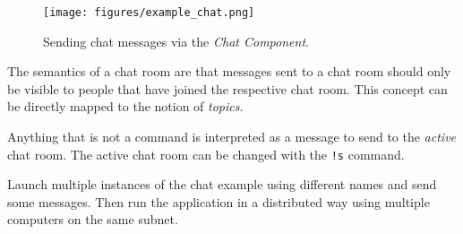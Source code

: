 \begin{enumerate}
\begin{figure}[htpb]
	\centering
	\texttt{[image: figures/example\_chat.png]}
	\caption{Sending chat messages via the \emph{Chat Component}.}
	\label{fig:example_chat}
\end{figure}

		The semantics of a chat room are that messages sent to a chat room should only be visible to people that have joined the respective chat room.
		This concept can be directly mapped to the notion of \emph{topics}.
		
		Anything that is not a command is interpreted as a message to send to the \emph{active} chat room.
		The active chat room can be changed with the \texttt{!s} command.
		
		Launch multiple instances of the chat example using different names and send some messages.
		Then run the application in a distributed way using multiple computers on the same subnet.

\end{enumerate}
